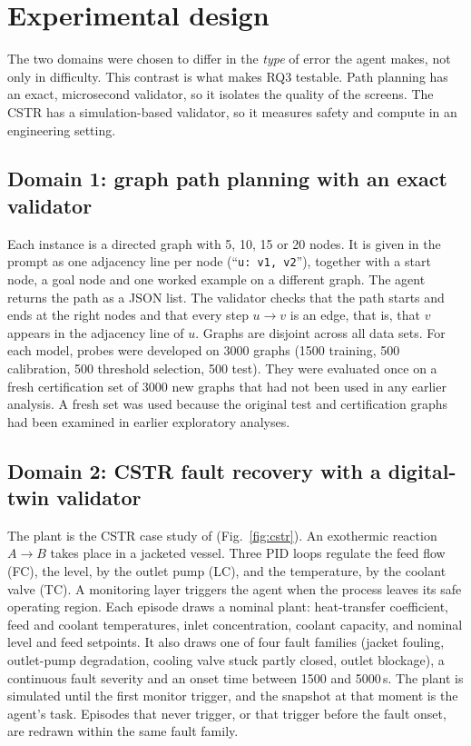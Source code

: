 \section{Experimental design}\label{sec:setup}

The two domains were chosen to differ in the \emph{type} of error the agent makes, not only in difficulty. This
contrast is what makes RQ3 testable. Path planning has an exact, microsecond validator, so it isolates the
quality of the screens. The CSTR has a simulation-based validator, so it measures safety and compute in an
engineering setting.

\subsection{Domain 1: graph path planning with an exact validator}
Each instance is a directed graph with 5, 10, 15 or 20 nodes. It is given in the prompt as one adjacency line per
node (``\texttt{u: v1, v2}''), together with a start node, a goal node and one worked example on a different
graph. The agent returns the path as a JSON list. The validator checks that the path starts and ends at the
right nodes and that every step $u\to v$ is an edge, that is, that $v$ appears in the adjacency line of $u$.
Graphs are disjoint across all data sets. For each model, probes were developed on 3000 graphs (1500 training,
500 calibration, 500 threshold selection, 500 test). They were evaluated once on a fresh certification set of
3000 new graphs that had not been used in any earlier analysis. A fresh set was used because the
original test and certification graphs had been examined in earlier exploratory analyses.

\subsection{Domain 2: CSTR fault recovery with a digital-twin validator}
The plant is the CSTR case study of \citet{car_todo} (Fig.~\ref{fig:cstr}). An exothermic reaction
$A\rightarrow B$ takes place in a jacketed vessel. Three PID loops regulate the feed flow (FC), the level, by the
outlet pump (LC), and the temperature, by the coolant valve (TC). A monitoring layer triggers the agent when the
process leaves its safe operating region. Each episode draws a nominal plant: heat-transfer coefficient, feed and
coolant temperatures, inlet concentration, coolant capacity, and nominal level and feed setpoints. It also draws
one of four fault families (jacket fouling, outlet-pump degradation, cooling valve stuck partly closed, outlet
blockage), a continuous fault severity and an onset time between 1500 and 5000\,s. The plant is simulated until
the first monitor trigger, and the snapshot at that moment is the agent's task. Episodes that never trigger, or
that trigger before the fault onset, are redrawn within the same fault family.

